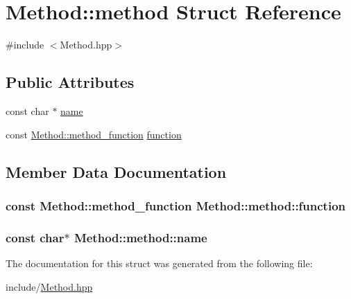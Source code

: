 \hypertarget{structMethod_1_1method}{\section{Method\-:\-:method Struct Reference}
\label{structMethod_1_1method}
}


{\ttfamily \#include $<$Method.\-hpp$>$}

\subsection*{Public Attributes}
\begin{DoxyCompactItemize}
\item 
const char $\ast$ \hyperlink{structMethod_1_1method_a9a612990df1fc4b0346348e45ab2dd38}{name}
\item 
const \hyperlink{classMethod_a3aa0940bc4e4fdc07d065851cc8f7800}{Method\-::method\-\_\-function} \hyperlink{structMethod_1_1method_a85fb6ad626719576ddca675b6d47db49}{function}
\end{DoxyCompactItemize}


\subsection{Member Data Documentation}
\hypertarget{structMethod_1_1method_a85fb6ad626719576ddca675b6d47db49}{
\subsubsection[{function}]{\setlength{\rightskip}{0pt plus 5cm}const {\bf Method\-::method\-\_\-function} Method\-::method\-::function}}\label{structMethod_1_1method_a85fb6ad626719576ddca675b6d47db49}
\hypertarget{structMethod_1_1method_a9a612990df1fc4b0346348e45ab2dd38}{
\subsubsection[{name}]{\setlength{\rightskip}{0pt plus 5cm}const char$\ast$ Method\-::method\-::name}}\label{structMethod_1_1method_a9a612990df1fc4b0346348e45ab2dd38}


The documentation for this struct was generated from the following file\-:\begin{DoxyCompactItemize}
\item 
include/\hyperlink{Method_8hpp}{Method.\-hpp}\end{DoxyCompactItemize}
